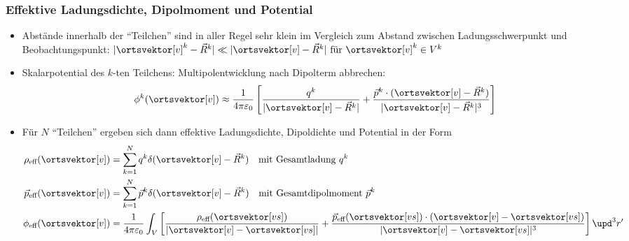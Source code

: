 \begin{frame}

  \frametitle{Effektive Ladungsdichte, Dipolmoment und Potential}
  \begin{itemize}[<+->]
  \item Abstände innerhalb der \enquote{Teilchen} sind in aller Regel sehr klein im Vergleich zum Abstand zwischen Ladungsschwerpunkt und Beobachtungspunkt: $|\ortsvektor[v]^k -  \vec{R}^k| \ll  |\ortsvektor[v] - \vec{R}^k | \text{ für } \ortsvektor[v]^k \in V^k $
  \item \alert{Skalarpotential des $k$-ten Teilchens}: Multipolentwicklung nach Dipolterm abbrechen:
    $$
    \phi^k(\ortsvektor[v]) \approx \frac{1}{4\pi\varepsilon_0} \left[ \frac{q^k}{|\ortsvektor[v] - \vec{R}^k |} + \frac{\vec{p}^k \cdot (\ortsvektor[v] - \vec{R}^k )}{|\ortsvektor[v] - \vec{R}^k |^3} \right] 
    $$
  \item Für $N$ \enquote{Teilchen} ergeben sich dann \alert{effektive} Ladungsdichte, Dipoldichte und Potential in  der Form
    \begin{align*}
      \rho_{\text{eff}}(\ortsvektor[v]) & = \sum_{k=1}^N q^k\delta (\ortsvektor[v] - \vec{R}^k ) \quad\text{mit Gesamtladung } q^k\\
      \vec{p}_{\text{eff}}(\ortsvektor[v]) &= \sum_{k=1}^N \vec{p}^k\delta (\ortsvektor[v] - \vec{R}^k ) \quad\text{mit Gesamtdipolmoment } \vec{p}^k\\
      \phi _{\text{eff}}(\ortsvektor[v]) &= \frac{1}{4\pi\varepsilon_0} \int_V \left[ \frac{\rho_{\text{eff}}(\ortsvektor[vs])}{|\ortsvektor[v] - \ortsvektor[vs] |} + \frac{\vec{p}_{\text{eff}}(\ortsvektor[vs])  \cdot (\ortsvektor[v] - \ortsvektor[vs] )}{|\ortsvektor[v] - \ortsvektor[vs] |^3} \right] \upd^3 r'  
      \end{align*}
 \end{itemize}
  
  \end{frame}

